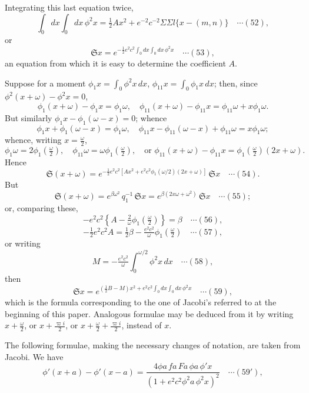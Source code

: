 \documentclass[12pt,a4paper]{article}
\providecommand{\fS}{\mathfrak{S}}
\providecommand{\mn}{(m,n)}
\begin{document}
\newpage
\setcounter{page}{152}

Integrating this last equation twice,
\[
\int_0 dx\int_0 dx\,\phi^2 x = \tfrac{1}{2}Ax^2 + e^{-2}c^{-2}\Sigma\Sigma l\{x-\mn\} \quad\cdots(52),
\]
or
\[
\fS x = e^{-\frac12 e^2 c^2 \int_0 dx \int_0 dx\, \phi^2 x} \quad\cdots(53),
\]
an equation from which it is easy to determine the coefficient $A$.

Suppose for a moment $\phi_1 x = \int_0 \phi^2 x\, dx$, $\phi_{11} x = \int_0 \phi_1 x\, dx$; then, since $\phi^2(x+\omega) - \phi^2 x = 0$,
\[
\phi_1(x+\omega) - \phi_1 x = \phi_1\omega,\quad \phi_{11}(x+\omega) - \phi_{11} x = \phi_{11}\omega + x\phi_1\omega.
\]
But similarly $\phi_1 x - \phi_1(\omega - x) = 0$; whence
\[
\phi_1 x + \phi_1(\omega - x) = \phi_1\omega,\quad \phi_{11} x - \phi_{11}(\omega - x) + \phi_{11}\omega = x\phi_1\omega;
\]
whence, writing $x = \tfrac{\omega}{2}$,
\[
\phi_1\omega = 2\phi_1\!\left(\tfrac{\omega}{2}\right),\quad \phi_{11}\omega = \omega\phi_1\!\left(\tfrac{\omega}{2}\right),\quad\text{or }\phi_{11}(x+\omega) - \phi_{11} x = \phi_1\!\left(\tfrac{\omega}{2}\right)(2x+\omega).
\]
Hence
\[
\fS(x+\omega) = e^{-\frac12 e^2 c^2 [Ax^2 + e^2 c^2 \phi_1(\omega/2)(2x+\omega)]}\,\fS x \quad\cdots(54).
\]
But
\[
\fS(x+\omega) = e^{\beta\omega^2}\, q_1^{-1}\, \fS x = e^{\beta(2x\omega + \omega^2)}\, \fS x \quad\cdots(55);
\]
or, comparing these,
\[
-e^2 c^2\left\{A - \tfrac{2}{\omega}\phi_1\!\left(\tfrac{\omega}{2}\right)\right\} = \beta \quad\cdots(56),
\]
\[
-\tfrac{1}{2} e^2 c^2 A = \tfrac{1}{2}\beta - \tfrac{e^2 c^2}{\omega}\phi_1\!\left(\tfrac{\omega}{2}\right) \quad\cdots(57),
\]
or writing
\[
M = -\tfrac{e^2 c^2}{\omega}\int_0^{\omega/2}\phi^2 x\, dx \quad\cdots(58),
\]
then
\[
\fS x = e^{(\frac12 B - M)x^2 + e^2 c^2 \int_0 dx \int_0 dx\, \phi^2 x} \quad\cdots(59),
\]
which is the formula corresponding to the one of Jacobi's referred to at the beginning of this paper. Analogous formulae may be deduced from it by writing $x + \tfrac{\omega}{2}$, or $x + \tfrac{\varpi i}{2}$, or $x + \tfrac{\omega}{2} + \tfrac{\varpi i}{2}$, instead of $x$.

The following formulae, making the necessary changes of notation, are taken from Jacobi. We have
\[
\phi'(x+a) - \phi'(x-a) = \frac{4\phi a\, fa\, Fa\, \phi a\, \phi'x}{(1+e^2 c^2 \phi^2 a\, \phi^2 x)^2}\quad\cdots(59'),
\]

\newpage
\setcounter{page}{153}
\end{document}
